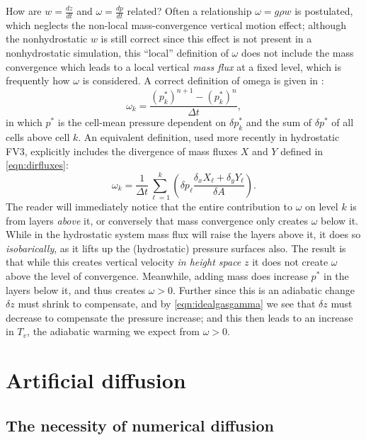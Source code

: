 \documentclass[10pt,letterpaper,margin=1in]{memoir}
\begin{document}
How are $w = \frac{dz}{dt}$ and $\omega = \frac{dp}{dt}$ related? Often a relationship $\omega = g\rho w$ is postulated, which neglects the non-local mass-convergence vertical motion effect; although the nonhydrostatic $w$ is still correct since this effect is not present in a nonhydrostatic simulation, this ``local'' definition of $\omega$ does not include the mass convergence which leads to a local vertical \textit{mass flux} at a fixed level, which is frequently how $\omega$ is considered. A correct definition of omega is given in \citet{L04}:
\begin{equation}
\omega_k = \frac{\left (p_k^* \right )^{n+1} - \left (p_k^* \right)^{n}}{\Delta t},
\end{equation}
in which $p^*$ is the cell-mean pressure dependent on $\delta p^*_k$ and the sum of $\delta p^*$ of all cells above cell $k$. An equivalent definition, used more recently in hydrostatic FV3, explicitly includes the divergence of mass fluxes $X$ and $Y$ defined in \eqref{eqn:dirfluxes}:
\begin{equation}
\omega_k = \frac{1}{\Delta t} \sum_{\ell=1}^k \left ( \delta p_\ell \frac{\delta_x X_\ell + \delta_y Y_\ell}{\delta A} \right ).
\end{equation}
The reader will immediately notice that the entire contribution to $\omega$ on level $k$ is from layers \textit{above} it, or conversely that mass convergence only creates $\omega$ below it. While in the hydrostatic system mass flux will raise the layers above it, it does so \textit{isobarically}, as it lifts up the (hydrostatic) pressure surfaces also. The result is that while this creates vertical velocity \textit{in height space} $z$ it does not create $\omega$ above the level of convergence. Meanwhile,  adding mass does increase $p^*$ in the layers below it, and thus creates $\omega > 0$. Further since this is an adiabatic change $\delta z$ must shrink to compensate, and by \eqref{eqn:idealgasgamma} we see that $\delta z$ must decrease to compensate the pressure increase; and this then leads to an increase in $T_v$, the adiabatic warming we expect from $\omega > 0$. 

\chapter{Artificial diffusion} \label{chap:diffusion}

\section{The necessity of numerical diffusion}
\end{document}
